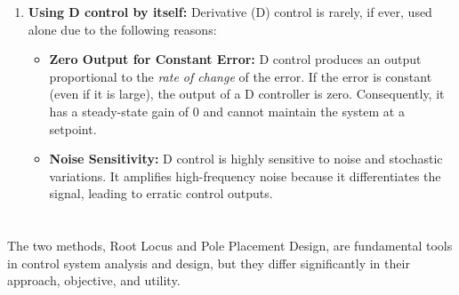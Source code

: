 \documentclass[a4paper,12pt]{article}
\begin{document}
\begin{enumerate}[label=\alph*.]
    \item \textbf{Using D control by itself:}
    Derivative (D) control is rarely, if ever, used alone due to the following reasons:
    \begin{itemize}
        \item \textbf{Zero Output for Constant Error:} D control produces an output proportional to the \textit{rate of change} of the error. If the error is constant (even if it is large), the output of a D controller is zero. Consequently, it has a steady-state gain of 0 and cannot maintain the system at a setpoint.
        \item \textbf{Noise Sensitivity:} D control is highly sensitive to noise and stochastic variations. It amplifies high-frequency noise because it differentiates the signal, leading to erratic control outputs.
    \end{itemize}
\end{enumerate}


\section{}

The two methods, Root Locus and Pole Placement Design, are fundamental tools in control system analysis and design, but they differ significantly in their approach, objective, and utility.
\end{document}
